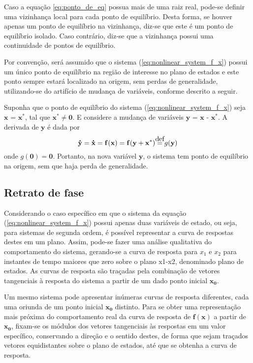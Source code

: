 Caso a equação \ref{eq:ponto_de_eq} possua mais de uma raiz real, pode-se definir uma vizinhança local para cada ponto de equilíbrio. Desta forma, se houver apenas um ponto de equilíbrio na vizinhança, diz-se que este é um ponto de equilíbrio isolado. Caso contrário, diz-se que a vizinhança possui uma continuidade de pontos de equilíbrio.

Por convenção, será assumido que o sistema (\ref{eq:nonlinear_system_f_x}) possui um único ponto de equilíbrio na região de interesse no plano de estados e este ponto sempre estará localizado na origem, sem perdas de generalidade, utilizando-se do artifício de mudança de variáveis, conforme descrito a seguir.

Suponha que o ponto de equilíbrio do sistema (\ref{eq:nonlinear_system_f_x}) seja $\textbf{x = x}^*$, tal que $\textbf{x}^* \neq \textbf{0}$. E considere a mudança de variáveis $\textbf{y = x - x}^*$. A derivada de $\textbf{y}$ é dada por
\begin{equation*}\mathbf{\dot{y} = \dot{x} = f(x) = f(y + x^*)}
 \myeq 
g(\textbf{y})
\end{equation*}
onde $g(\textbf{0}) = \textbf{0}$. Portanto, na nova variável $\textbf{y}$, o sistema tem ponto de equilíbrio na origem, sem que haja perda de generalidade.

\subsection{Retrato de fase} \label{subsec_phasePortrait}

Considerando o caso específico em que o sistema da equação (\ref{eq:nonlinear_system_f_x}) possui apenas duas variáveis de estado, ou seja, para sistemas de segunda ordem, é possível representar a curva de respostas destes em um plano. Assim, pode-se fazer uma análise qualitativa do comportamento do sistema, gerando-se a curva de resposta para $x_1$ e $x_2$ para instantes de tempo maiores que zero sobre o plano x1-x2, denominado plano de estados. As curvas de resposta são traçadas pela combinação de vetores tangenciais à resposta do sistema a partir de um dado ponto inicial $\mathbf{x_0}$.

Um mesmo sistema pode apresentar inúmeras curvas de resposta diferentes, cada uma oriunda de um ponto inicial $\mathbf{x_0}$ distinto. Para se obter uma representação mais próxima do comportamento real da curva de resposta de $\mathbf{f(x)}$ a partir de $\mathbf{x_0}$, fixam-se os módulos dos vetores tangenciais às respostas em um valor específico, conservando a direção e o sentido destes, de forma que sejam traçados vetores equidistantes sobre o plano de estados, até que se obtenha a curva de resposta.

